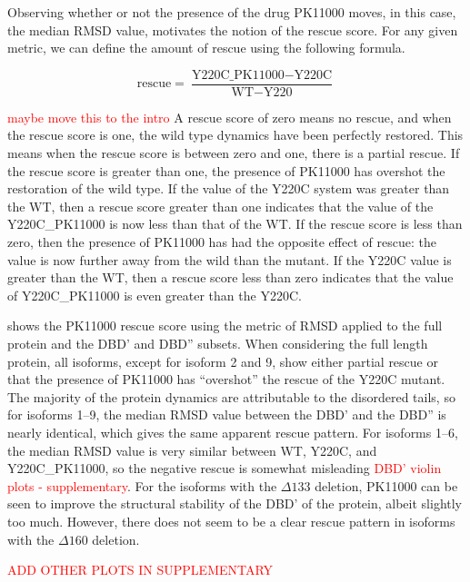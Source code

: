 Observing whether or not the presence of the drug PK11000 moves, in this case, the median RMSD value, motivates the notion of the rescue score. For any given metric, we can define the amount of rescue using the following formula.

\begin{equation*}
\text{rescue} = \frac{\text{Y220C\_PK11000} - \text{Y220C}}{\text{WT} - \text{Y220}}
\end{equation*}

\textcolor{red}{maybe move this to the intro}
A rescue score of zero means no rescue, and when the rescue score is one, the wild type dynamics have been perfectly restored. This means when the rescue score is between zero and one, there is a partial rescue. If the rescue score is greater than one, the presence of PK11000 has overshot the restoration of the wild type. If the value of the Y220C system was greater than the WT, then a rescue score greater than one indicates that the value of the Y220C\_PK11000 is now less than that of the WT. If the rescue score is less than zero, then the presence of PK11000 has had the opposite effect of rescue: the value is now further away from the wild than the mutant. If the Y220C value is greater than the WT, then a rescue score less than zero indicates that the value of Y220C\_PK11000 is even greater than the Y220C.

 shows the PK11000 rescue score using the metric of RMSD applied to the full protein and the DBD' and DBD'' subsets. When considering the full length protein, all isoforms, except for isoform \num{2} and \num{9}, show either partial rescue or that the presence of PK11000 has ``overshot'' the rescue of the Y220C mutant. The majority of the protein dynamics are attributable to the disordered tails, so for isoforms \numrange{1}{9}, the median RMSD value between the DBD' and the DBD'' is nearly identical, which gives the same apparent rescue pattern. For isoforms \numrange{1}{6}, the median RMSD value is very similar between WT, Y220C, and Y220C\_PK11000, so the negative rescue is somewhat misleading \textcolor{red}{DBD' violin plots - supplementary}. For the isoforms with the \(\Delta 133\) deletion, PK11000 can be seen to improve the structural stability of the DBD' of the protein, albeit slightly too much. However, there does not seem to be a clear rescue pattern in isoforms with the \(\Delta 160\) deletion.

\textcolor{red}{ADD OTHER PLOTS IN SUPPLEMENTARY}

